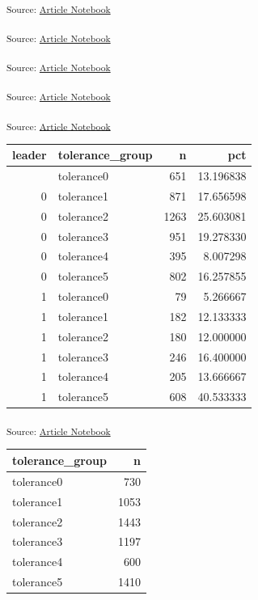 \documentclass[
  letterpaper,
  DIV=11,
  numbers=noendperiod]{scrartcl}
\begin{document}
\textsubscript{Source:
\href{https://h-christy.github.io/data-ethics-final/index.qmd.html}{Article
Notebook}}

\textsubscript{Source:
\href{https://h-christy.github.io/data-ethics-final/index.qmd.html}{Article
Notebook}}

\textsubscript{Source:
\href{https://h-christy.github.io/data-ethics-final/index.qmd.html}{Article
Notebook}}

\textsubscript{Source:
\href{https://h-christy.github.io/data-ethics-final/index.qmd.html}{Article
Notebook}}

\textsubscript{Source:
\href{https://h-christy.github.io/data-ethics-final/index.qmd.html}{Article
Notebook}}

\begin{longtable}[]{@{}rlrr@{}}
\toprule\noalign{}
leader & tolerance\_group & n & pct \\
\midrule\noalign{}
\endhead
\bottomrule\noalign{}
\endlastfoot
0 & tolerance0 & 651 & 13.196838 \\
0 & tolerance1 & 871 & 17.656598 \\
0 & tolerance2 & 1263 & 25.603081 \\
0 & tolerance3 & 951 & 19.278330 \\
0 & tolerance4 & 395 & 8.007298 \\
0 & tolerance5 & 802 & 16.257855 \\
1 & tolerance0 & 79 & 5.266667 \\
1 & tolerance1 & 182 & 12.133333 \\
1 & tolerance2 & 180 & 12.000000 \\
1 & tolerance3 & 246 & 16.400000 \\
1 & tolerance4 & 205 & 13.666667 \\
1 & tolerance5 & 608 & 40.533333 \\
\end{longtable}

\textsubscript{Source:
\href{https://h-christy.github.io/data-ethics-final/index.qmd.html}{Article
Notebook}}

\begin{longtable}[]{@{}lr@{}}
\toprule\noalign{}
tolerance\_group & n \\
\midrule\noalign{}
\endhead
\bottomrule\noalign{}
\endlastfoot
tolerance0 & 730 \\
tolerance1 & 1053 \\
tolerance2 & 1443 \\
tolerance3 & 1197 \\
tolerance4 & 600 \\
tolerance5 & 1410 \\
\end{longtable}
\end{document}
